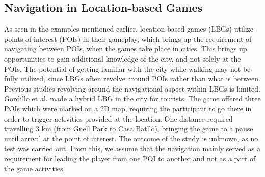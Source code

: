 \subsection{Navigation in Location-based Games}
As seen in the examples mentioned earlier, location-based games (LBGs) utilize points of interest (POIs) in their gameplay, which brings up the requirement of navigating between POIs, when the games take place in cities. This brings up opportunities to gain additional knowledge of the city, and not solely at the POIs. The potential of getting familiar with the city while walking may not be fully utilized, since LBGs often revolve around POIs rather than what is between. Previous studies revolving around the navigational aspect within LBGs is limited. 
Gordillo et al. made a hybrid LBG in the city for tourists\cite{Learninggamified}. The game offered three POIs which were marked on a 2D map, requiring the participant to go there in order to trigger activities provided at the location.  One distance required travelling 3 km (from G\"uell Park to Casa Batll\`{o}), bringing the game to a pause until arrival at the point of interest.  The outcome of the study is unknown, as no test was carried out. From this, we assume that the navigation mainly served as a requirement for leading the player from one POI to another and not as a part of the game activities.

